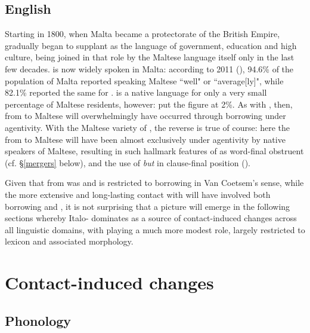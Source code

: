\documentclass[output=paper]{langsci/langscibook}
\begin{document}
\subsection{English} \label{English}
Starting in 1800, when Malta became a protectorate of the British Empire,  gradually began to supplant  as the language of government, education and high culture, being joined in that role by the Maltese language itself only in the last few decades.  is now widely spoken in Malta: according to 2011  (\citealt[149]{census2011}), 94.6\% of the population of Malta reported speaking Maltese ``well" or ``average[ly]", while 82.1\% reported the same for .  is a native language for only a very small percentage of Maltese residents, however: \cite{scirihavassallo2006} put the figure at 2\%. As with , then,  from  to Maltese will overwhelmingly have occurred through borrowing under  agentivity. With the Maltese variety of , the reverse is true of course: here the  from  to Maltese will have been almost exclusively  under  agentivity by native speakers of Maltese, resulting in such hallmark features of  as word-final obstruent  (cf. §\ref{mergers} below), and the use of \textit{but} in clause-final position (\citealt[527]{Lucas2015}).

Given that  from  was and is restricted to borrowing in Van Coetsem's sense, while the more extensive and long-lasting contact with  will have involved both borrowing and , it is not surprising that a picture will emerge in the following sections whereby Italo- dominates as a source of contact-induced changes across all linguistic domains, with  playing a much more modest role, largely restricted to lexicon and associated  morphology.

\section{Contact-induced changes
}
\subsection{Phonology}
\end{document}
